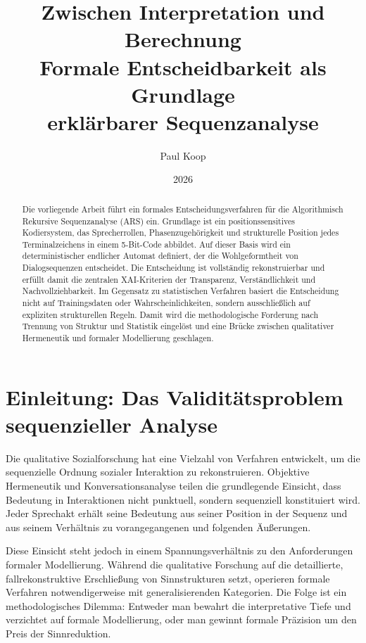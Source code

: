 \documentclass[
  12pt,
  a4paper,
  oneside,
  titlepage
]{article}
\title{\Huge\textbf{Zwischen Interpretation und Berechnung} \\
       \LARGE Formale Entscheidbarkeit als Grundlage \\
       \LARGE erklärbarer Sequenzanalyse}
\author{
  \large
  \begin{tabular}{c}
    Paul Koop
  \end{tabular}
}
\date{\large 2026}
\begin{document}
\maketitle

\begin{abstract}
Die vorliegende Arbeit führt ein formales Entscheidungsverfahren für die 
Algorithmisch Rekursive Sequenzanalyse (ARS) ein. Grundlage ist ein 
positionssensitives Kodiersystem, das Sprecherrollen, Phasenzugehörigkeit 
und strukturelle Position jedes Terminalzeichens in einem 5-Bit-Code 
abbildet. Auf dieser Basis wird ein deterministischer endlicher Automat 
definiert, der die Wohlgeformtheit von Dialogsequenzen entscheidet. 
Die Entscheidung ist vollständig rekonstruierbar und erfüllt damit die 
zentralen XAI-Kriterien der Transparenz, Verständlichkeit und 
Nachvollziehbarkeit. Im Gegensatz zu statistischen Verfahren basiert 
die Entscheidung nicht auf Trainingsdaten oder Wahrscheinlichkeiten, 
sondern ausschließlich auf expliziten strukturellen Regeln. Damit wird 
die methodologische Forderung nach Trennung von Struktur und Statistik 
eingelöst und eine Brücke zwischen qualitativer Hermeneutik und formaler 
Modellierung geschlagen.
\end{abstract}

\newpage
\tableofcontents
\newpage

\section{Einleitung: Das Validitätsproblem sequenzieller Analyse}

Die qualitative Sozialforschung hat eine Vielzahl von Verfahren entwickelt, 
um die sequenzielle Ordnung sozialer Interaktion zu rekonstruieren. 
Objektive Hermeneutik \citep{Oevermann1979} und Konversationsanalyse 
\citep{Sacks1974} teilen die grundlegende Einsicht, dass Bedeutung in 
Interaktionen nicht punktuell, sondern sequenziell konstituiert wird. 
Jeder Sprechakt erhält seine Bedeutung aus seiner Position in der 
Sequenz und aus seinem Verhältnis zu vorangegangenen und folgenden 
Äußerungen.

Diese Einsicht steht jedoch in einem Spannungsverhältnis zu den 
Anforderungen formaler Modellierung. Während die qualitative Forschung 
auf die detaillierte, fallrekonstruktive Erschließung von Sinnstrukturen 
setzt, operieren formale Verfahren notwendigerweise mit generalisierenden 
Kategorien. Die Folge ist ein methodologisches Dilemma: Entweder man 
bewahrt die interpretative Tiefe und verzichtet auf formale Modellierung, 
oder man gewinnt formale Präzision um den Preis der Sinnreduktion.
\end{document}
